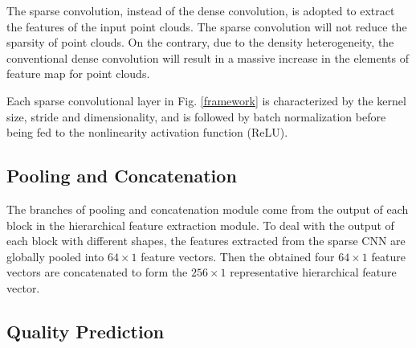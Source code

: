 \documentclass[acmsmall]{acmart}
\begin{document}
\par The sparse convolution, instead of the dense convolution, is adopted to extract the features of the input point clouds. The sparse convolution will not reduce the sparsity of point clouds. On the contrary, due to the density heterogeneity, the conventional dense convolution will result in a massive increase in the elements of feature map for point clouds.

\par Each sparse convolutional layer in Fig. \ref{framework} is characterized by the kernel size, stride and dimensionality, and is followed by batch normalization before being fed to the nonlinearity activation function (ReLU).


\subsection{Pooling and Concatenation}

\par The branches of pooling and concatenation module come from the output of each block in the hierarchical feature extraction module. To deal with the output of each block with different shapes, the features extracted from the sparse CNN are globally pooled into $64\times 1$ feature vectors. Then the obtained four $64\times 1$ feature vectors are concatenated to form the $256\times 1$ representative hierarchical feature vector.


\subsection{Quality Prediction}
\end{document}
